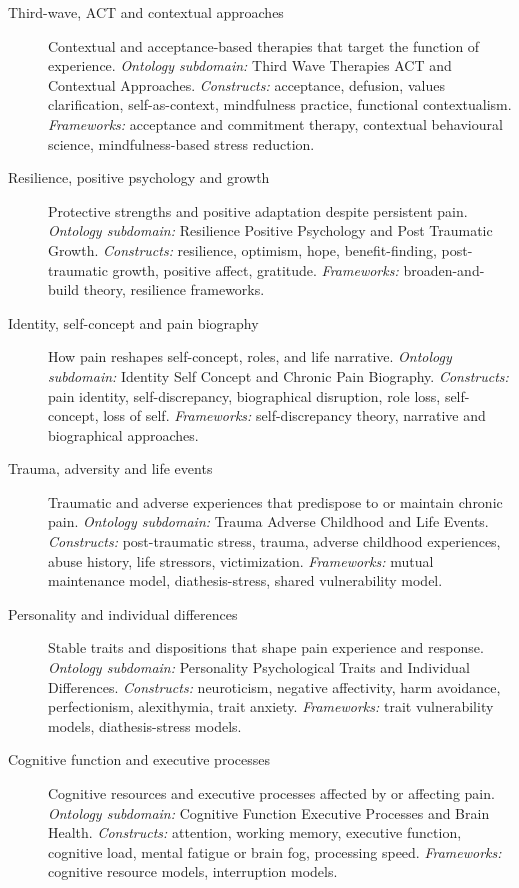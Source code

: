 \documentclass[11pt]{article}
\begin{document}
\begin{description}
\item[Third-wave, ACT and contextual approaches] Contextual and acceptance-based therapies that target the function of experience.
{\small \textit{Ontology subdomain:} Third Wave Therapies ACT and Contextual Approaches. \textit{Constructs:} acceptance, defusion, values clarification, self-as-context, mindfulness practice, functional contextualism. \textit{Frameworks:} acceptance and commitment therapy, contextual behavioural science, mindfulness-based stress reduction.}
\item[Resilience, positive psychology and growth] Protective strengths and positive adaptation despite persistent pain.
{\small \textit{Ontology subdomain:} Resilience Positive Psychology and Post Traumatic Growth. \textit{Constructs:} resilience, optimism, hope, benefit-finding, post-traumatic growth, positive affect, gratitude. \textit{Frameworks:} broaden-and-build theory, resilience frameworks.}
\item[Identity, self-concept and pain biography] How pain reshapes self-concept, roles, and life narrative.
{\small \textit{Ontology subdomain:} Identity Self Concept and Chronic Pain Biography. \textit{Constructs:} pain identity, self-discrepancy, biographical disruption, role loss, self-concept, loss of self. \textit{Frameworks:} self-discrepancy theory, narrative and biographical approaches.}
\item[Trauma, adversity and life events] Traumatic and adverse experiences that predispose to or maintain chronic pain.
{\small \textit{Ontology subdomain:} Trauma Adverse Childhood and Life Events. \textit{Constructs:} post-traumatic stress, trauma, adverse childhood experiences, abuse history, life stressors, victimization. \textit{Frameworks:} mutual maintenance model, diathesis-stress, shared vulnerability model.}
\item[Personality and individual differences] Stable traits and dispositions that shape pain experience and response.
{\small \textit{Ontology subdomain:} Personality Psychological Traits and Individual Differences. \textit{Constructs:} neuroticism, negative affectivity, harm avoidance, perfectionism, alexithymia, trait anxiety. \textit{Frameworks:} trait vulnerability models, diathesis-stress models.}
\item[Cognitive function and executive processes] Cognitive resources and executive processes affected by or affecting pain.
{\small \textit{Ontology subdomain:} Cognitive Function Executive Processes and Brain Health. \textit{Constructs:} attention, working memory, executive function, cognitive load, mental fatigue or brain fog, processing speed. \textit{Frameworks:} cognitive resource models, interruption models.}

\end{description}
\end{document}
